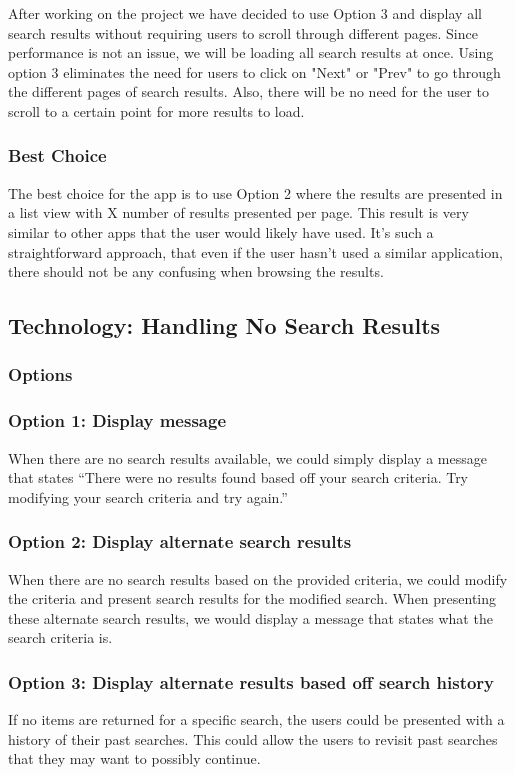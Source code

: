 \documentclass[journal,compsoc, 10pt, draftclsnofoot, onecolumn]{IEEEtran}
\begin{document}
After working on the project we have decided to use Option 3 and display all 
search results without requiring users to scroll through different pages. 
Since performance is not an issue, we will be loading all search results at 
once. Using option 3 eliminates the need for users to click on 
"Next" or "Prev" to go through the different pages of search results. Also, 
there will be no need for the user to scroll to a certain point for more 
results to load. 

\subsubsection{Best Choice}
The best choice for the app is to use Option 2 where the results are presented in 
a list view with X number of results presented per page. This result is very 
similar to other apps that the user would likely have used. It's such a 
straightforward approach, that even if the user hasn't used a similar 
application, there should not be any confusing when browsing the results. 

\subsection{Technology: Handling No Search Results}
\subsubsection{Options}

\subsubsection*{Option 1: Display message}
When there are no search results available, we could simply display a message 
that states ``There were no results found based off your search criteria. Try 
modifying your search criteria and try again.''
\subsubsection*{Option 2: Display alternate search results}
When there are no search results based on the provided criteria, we could 
modify the criteria and present search results for the modified search. When 
presenting these alternate search results, we would display a message that 
states what the search criteria is.
\subsubsection*{Option 3: Display alternate results based off search history}
If no items are returned for a specific search, the users could be presented 
with a history of their past searches. This could allow the users to revisit 
past searches that they may want to possibly continue.
\end{document}

